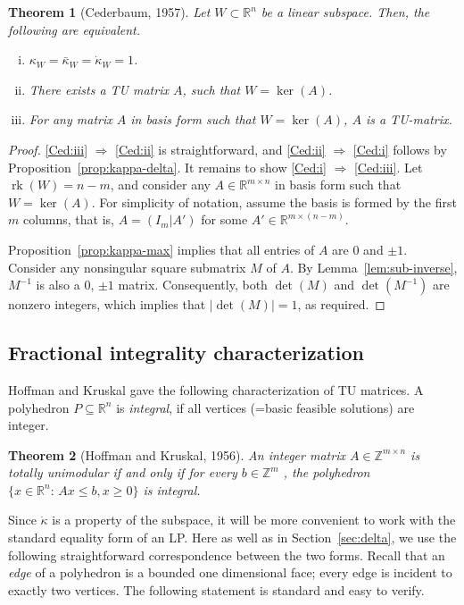 \documentclass[11pt, a4paper]{article}
\newcommand{\1}{\mathbbm{1}}
\newcommand{\rk}{\operatorname{rk}}
\newcommand{\kd}{{\dot{\kappa}}}
\newtheorem{theorem}{Theorem}[section]
\theoremstyle{case}
\newcommand{\R}{\mathbb{R}}
\newcommand{\Z}{\mathbb{Z}}
\begin{document}
\begin{theorem}[Cederbaum, 1957]
  \label{thm:tu_iff_kappa_1}
  Let $W \subset \R^n$ be a linear subspace. Then, the following are equivalent.
  \begin{enumerate}[(i)]
  \item\label{Ced:i} $\kappa_W=\bar\kappa_W=\kd_W = 1$.
  \item\label{Ced:ii} There exists a TU matrix $A$, such that $W = \ker(A)$.
  \item\label{Ced:iii} For any matrix $A$ in basis form such that $W=\ker(A)$, $A$ is a TU-matrix.
  \end{enumerate} 
\end{theorem}
\begin{proof}
\ref{Ced:iii} $\Rightarrow$ \ref{Ced:ii} is straightforward, and \ref{Ced:ii} $\Rightarrow$ \ref{Ced:i} follows by  Proposition~\ref{prop:kappa-delta}. It remains to show \ref{Ced:i} $\Rightarrow$ \ref{Ced:iii}. Let $\rk(W)=n-m$, and consider any $A\in \R^{m\times n}$ in basis form such that $W=\ker(A)$. For simplicity of notation, assume the basis is formed by the first $m$ columns, that is, 
 $A=(I_{m} | A')$ for some $A' \in \R^{m \times (n-m)}$.

Proposition~\ref{prop:kappa-max} implies that all entries of $A$ are $0$ and $\pm 1$. Consider any nonsingular square submatrix $M$ of $A$.
By Lemma~\ref{lem:sub-inverse}, $M^{-1}$ is also a $0$, $\pm 1$ matrix.
 Consequently, both $\det(M)$ and $\det(M^{-1})$ are nonzero integers, which implies that $|\det(M)|=1$, as required.
\end{proof}

\subsection{Fractional integrality characterization}\label{sec:HK}

Hoffman and Kruskal \cite{Hoffman56} gave the following characterization of TU matrices. A polyhedron $P\subseteq \R^n$ is \emph{integral}, if all vertices (=basic feasible solutions) are integer.
\begin{theorem}[Hoffman and Kruskal, 1956]\label{thm:HK}
An integer matrix $A\in\Z^{m\times n}$ is totally unimodular if and only if for every $b\in\Z^m$
, the polyhedron $\{x\in \R^n:\, Ax\le b,x\ge 0\}$
 is integral.
\end{theorem}

Since $\kd$ is a property of the subspace, it will be more convenient to work with the standard equality form of an LP. Here as well as in Section~\ref{sec:delta}, we use the following straightforward correspondence between the two forms. Recall that an \emph{edge} of a polyhedron is a bounded one dimensional face; every edge is incident to exactly two vertices. The following statement is standard and easy to verify.
\end{document}
